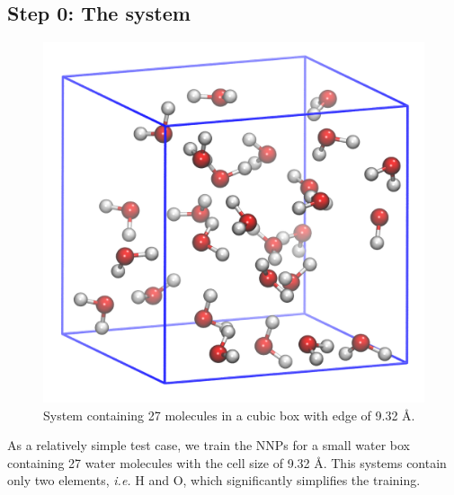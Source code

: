 \documentclass[12pt]{article}
\begin{document}
\subsection{Step 0: The system}
\begin{figure} [!htp]
    \centering
    \includegraphics[scale=0.05]{watertiny.jpeg}
    \caption{System containing 27 molecules in a cubic box with edge of 9.32 \AA.}
    \label{Rep_sys}
\end{figure}
 
%

As a relatively simple test case, we train the NNPs for a small water box containing 27 water molecules with the cell size of 9.32 \AA. This systems contain only two elements, \textit{i.e.} H and O, which significantly simplifies the training.
\end{document}
